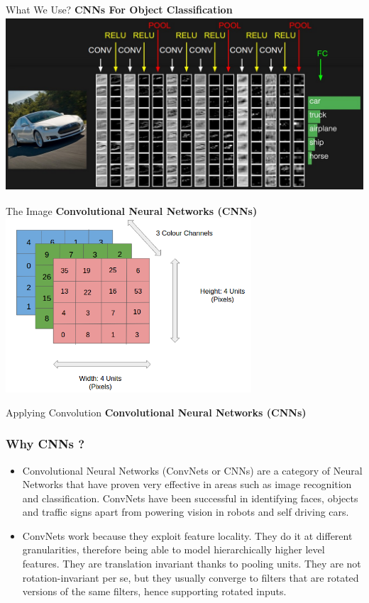 \documentclass{beamer}
\begin{document}
 \begin{frame}{What We Use?}
 \textbf{CNNs For Object Classification}
     \includegraphics[height=6.5cm,width=\textwidth]{simpleconv.jpeg}
\end{frame}

\begin{frame}{The Image}
 \textbf{Convolutional Neural Networks (CNNs)}
     \includegraphics[height=6.5cm,width=\textwidth]{img.png}
\end{frame}

 \begin{frame}{Applying Convolution}
 \textbf{Convolutional Neural Networks (CNNs)}
\end{frame}

\begin{frame}
\frametitle{Why CNNs ?}
\begin{itemize}
\item<1->Convolutional Neural Networks (ConvNets or CNNs) are a category of Neural Networks that have proven very effective in areas such as image recognition and classification. ConvNets have been successful in identifying faces, objects and traffic signs apart from powering vision in robots and self driving cars.
 \item<2->ConvNets work because they exploit feature locality. They do it at different granularities, therefore being able to model hierarchically higher level features. They are translation invariant thanks to pooling units. They are not rotation-invariant per se, but they usually converge to filters that are rotated versions of the same filters, hence supporting rotated inputs.
\end{itemize}
\end{frame}
\end{document}
